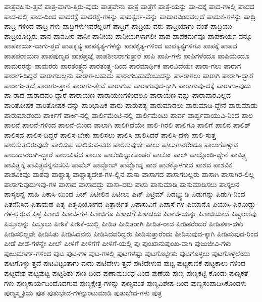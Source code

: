 {ಪಾತ್ರವಹಿಸು-ತ್ತವೆ
ಪಾತ್ರ-ವಾಗು-ತ್ತಿರು-ವುದು
ಪಾತ್ರವೇನು
ಪಾತ್ರೆ
ಪಾತ್ರೆಗೆ
ಪಾತ್ರೆ-ಯನ್ನು
ಪಾ-ದಕ್ಕೆ
ಪಾದ-ಗಳಲ್ಲಿ
ಪಾದದ
ಪಾದ-ದಲ್ಲಿ
ಪಾದ-ದಿಂದ
ಪಾದರಕ್ಷೆ
ಪಾದರಕ್ಷೆ-ಗಳನ್ನು
ಪಾದಸ್ಪರ್ಶ-ವನ್ನು
ಪಾದಾರವಿಂದವಲ್ಲದೆ
ಪಾದುಕೆ-ಗಳನ್ನು
ಪಾದ್ರಿ
ಪಾದ್ರಿ-ಗಳಿಂದ
ಪಾದ್ರಿ-ಗಳು
ಪಾದ್ರಿಗಳುಇವರೆಲ್ಲರಿಗೆ
ಪಾದ್ರಿಗೆ
ಪಾದ್ರಿಯ-ವರು
ಪಾದ್ರಿಯಾಗು-ವಂತೆ
ಪಾದ್ರಿಯು
ಪಾದ್ರಿಯೊಬ್ಬರು
ಪಾನ
ಪಾನಪೀಠ
ಪಾನೀ
ಪಾನೀಯ
ಪಾನೀಯಗಳಾಗಲೀ
ಪಾಪ
ಪಾಪಕರ್ಮವೂ
ಪಾಪಕಾರ್ಯ-ವನ್ನೂ
ಪಾಪಕಾರ್ಯ-ವಾಗು-ತ್ತದೆ
ಪಾಪಕೃತ್ಯ
ಪಾಪಕೃತ್ಯ-ಗಳನ್ನು
ಪಾಪಕೃತ್ಯ-ಗಳಿಂದ
ಪಾಪಕೃತ್ಯಗಳಿಗೂ
ಪಾಪಕ್ಕೆ
ಪಾಪದ
ಪಾಪಪರಾಯಣ
ಪಾಪಪುಣ್ಯದ
ಪಾಪಪ್ರಜ್ಞೆ
ಪಾಪಶೀಲರಾಗುತ್ತಾರೆ
ಪಾಪಿ
ಪಾಪಿ-ಗಳು
ಪಾಪಿಗಳೆಂದೂ
ಪಾಪಿಯೆಂದೂ
ಪಾಮರರನ್ನು
ಪಾಮರರು
ಪಾರತಂತ್ರ್ಯದ
ಪಾರತಂತ್ರ್ಯ-ದಿಂದ
ಪಾರಮಾರ್ಥಿಕ
ಪಾರವಿದೆಯೇ
ಪಾರಾ-ಗಲು
ಪಾರಾಗ
ಪಾರಾಗ-ದಿದ್ದರೆ
ಪಾರಾಗಬಲ್ಲನು
ಪಾರಾಗ-ಬಹುದು
ಪಾರಾಗಬಹುದೆಂಬುದನ್ನು
ಪಾ-ರಾಗಲು
ಪಾರಾಗಿ
ಪಾರಾಗಿ-ದ್ದಾರೆ
ಪಾರಾಗು-ತ್ತದೆ
ಪಾರಾಗು-ತ್ತಾನೆ
ಪಾರಾಗು-ತ್ತೇವೆ
ಪಾರಾಗುವ
ಪಾರಾಗುವುದ-ಕ್ಕಾಗಿ
ಪಾರಾಗುವು-ದಕ್ಕೆ
ಪಾರಾಗು-ವುದು
ಪಾ-ರಾದ
ಪಾರಾದವರಿ-ದ್ದಾರೆ
ಪಾರಾಯಣ
ಪಾರಾಯಣಗಳಿಂದಲೂ
ಪಾರಾಯಣ-ವನ್ನು
ಪಾರಾವಾರವಿಲ್ಲದ
ಪಾರಿತೋಷಕ
ಪಾರಿತೋಷಕ-ವನ್ನು
ಪಾರಿಭಾಷಿಕ
ಪಾರು
ಪಾರುಪತ್ಯ
ಪಾರುಮಾಡಲು
ಪಾರುಮಾಡಿ-ದ್ದೇನೆ
ಪಾರುಮಾಡು
ಪಾರುಮಾಡೆಂದು
ಪಾರ್ಕಿಗೆ
ಪಾರ್ಕಿ-ನಲ್ಲಿ
ಪಾರ್ಲಿಮೆಂಟಿ-ನಲ್ಲಿ
ಪಾರ್ಲಿಮೆಂಟು
ಪಾರ್ವ
ಪಾರ್ಶ್ವವಾಯುವಿ-ನಿಂದ
ಪಾಲ
ಪಾಲನೆ
ಪಾಲನೆ-ಗಳಿಂದ
ಪಾಲನೆ-ಯಿಂದ
ಪಾಲಾಗಿ
ಪಾಲಿಗಿದೆಯೇ
ಪಾಲಿ-ಗಿರಲಿ
ಪಾಲಿಗೂ
ಪಾಲಿಗೆ
ಪಾಲಿನ
ಪಾಲಿಶ್
ಪಾಲಿಸದ
ಪಾಲಿಸ-ದಿದ್ದರೆ
ಪಾಲಿಸ-ಬೇಕು
ಪಾಲಿಸಲು
ಪಾಲಿಸಿ
ಪಾಲಿಸಿದರೆ
ಪಾಲಿಸಿ-ದಳು
ಪಾಲಿ-ಸುತ್ತ
ಪಾಲಿಸುತ್ತಲಿರುವುದೇ
ಪಾಲಿಸುವ
ಪಾಲಿಸುವ-ವರು
ಪಾಲಿಸುವುದೇ
ಪಾಲು
ಪಾಲುಗಾರರೆಂದೂ
ಪಾಲುಗೊಳ್ಳುವ
ಪಾಲುದಾರರಾಗಿ-ದ್ದಾರೆ
ಪಾಲುವಿಷದ
ಪಾಲೂ
ಪಾಲೆಂದಿಟ್ಟುಕೊಂಡರೆ
ಪಾಲೋ
ಪಾಲ್
ಪಾಲ್ಗೊಂಡಿ-ದ್ದೇನೆ
ಪಾವಿತ್ರ್ಯ
ಪಾವಿತ್ರ್ಯಕ್ಕೆ
ಪಾವಿತ್ರ್ಯವನ್ನನುಸರಿಸಿ
ಪಾವೆಲ್
ಪಾವ್ಲೋವ್
ಪಾವ್ಲೋವ್ನ
ಪಾಶ
ಪಾಶಕ್ಕೊಳಗಾದ
ಪಾಶದ
ಪಾಶವಿಕ
ಪಾಶವಿಕವೂ
ಪಾಶವು
ಪಾಶ್ಚಾತ್ಯ
ಪಾಶ್ಚಾತ್ಯದೇಶ-ಗಳ-ಲ್ಲಿನ
ಪಾಸಾ
ಪಾಸಾಗದ
ಪಾಸಾಗಬಲ್ಲರು
ಪಾಸಾಗಿ
ಪಾಸಾಗಿರ-ಲಿಲ್ಲ
ಪಾಸಾಗುವುದುಇವು-ಗಳ
ಪಾಸಾದ
ಪಾಸಾದದ್ದು
ಪಾಸಾ-ದರು
ಪಾಸು
ಪಾಸುಮಾಡಿ
ಪಾಸುಮಾಡಿಸಲು
ಪಾಸ್ಕಲನ
ಪಾಸ್ಕಲನ್ಣ
ಪಾಹಿ
ಪಿಕಾಸಿ-ಯಿಂದ
ಪಿಚ್
ಪಿಟೀಲಿನ
ಪಿಟೀಲು
ಪಿಟ್
ಪಿಟ್ರಿಮ್
ಪಿಡಬ್ಲ್ಯುಡಿ
ಪಿಡುಗನ್ನು
ಪಿಡುಗಿ-ನಿಂದ
ಪಿತನೆನಿಸಿದ
ಪಿತಾಮಹ
ಪಿತೃ
ಪಿತೃವಿಯೋಗದ
ಪಿತ್ರಾರ್ಜಿತ
ಪಿಪಾಸುವಿಗೆ
ಪಿಪಾಸೆ-ಗಳ
ಪಿಯಾನೊ
ಪಿಯುಸಿ
ಪಿರಮಿಡ್ಡು-ಗಳ-ಲ್ಲಿರುವ
ಪಿಳ್ಳೆ
ಪಿಶಾಚಿ
ಪಿಶಾಚಿ-ಗಳ
ಪಿಶಾಚಿಗೂ
ಪಿಶಾಚಿಗೆ
ಪಿಶಾಚಿಯ
ಪಿಶಾಚಿ-ಯನ್ನು
ಪಿಶಾಚಿಯಾದೆ
ಪಿಷ್ಟಾಂಶವು
ಪಿಸ್ತೂಲನ್ನು
ಪಿಸ್ತೂಲು
ಪೀಠಿಕೆ
ಪೀಠಿಕೆ-ಯಲ್ಲಿ
ಪೀಡಿತ
ಪೀಡಿತರಾಗಿ
ಪೀಡಿತ-ರಾದ
ಪೀಡಿತರೆಂದರೆ
ಪೀಡಿತಳಾ-ದಳು
ಪೀಡಿಸಲಿಲ್ಲವೇ
ಪೀಡಿಸಿತು
ಪೀಡಿಸಿದವನು
ಪೀಡಿಸಿದವರಿದ್ದರು
ಪೀಡಿಸುತ್ತಾರೆಂದು
ಪೀಡಿಸುವುದ-ಕ್ಕಾಗಿ
ಪೀಡಿಸುವುದ-ರಿಂದ
ಪೀಡೆ
ಪೀಡೆ-ಗಳನ್ನೇ
ಪೀಲ್
ಪೀಳಿಗೆ
ಪೀಳಿಗೆಗೆ
ಪೀಳಿಗೆ-ಯಲ್ಲಿ
ಪು
ಪುಂಖಾನುಪುಂಖ-ವಾಗಿ
ಪುಜುಜೀವಿ-ಗಳು
ಪುಜುಮಾರ್ಗ-ಗಳಿಂದ
ಪುಟ
ಪುಟ-ಗಳ
ಪುಟ-ಗಳಲ್ಲಿ
ಪುಟಗಳಷ್ಟು
ಪುಟಗೊಟ್ಟೀತು
ಪುಟಗೊಳ್ಳಲು
ಪುಟಗೊಳ್ಳಲೆಂದು
ಪುಟಗೊಳ್ಳು-ತ್ತದೆ
ಪುಟವಿಟ್ಟಂತಾಗು-ವುದು
ಪುಟಿದೇಳು-ತ್ತದೆ
ಪುಟಿದೇಳುವ
ಪುಟ್ಟ
ಪುಟ್ಟಕಾಣಿಕೆ
ಪುಟ್ಟಕಾಲು-ಗಳಿಂದ
ಪುಟ್ಟದೇಶ
ಪುಟ್ಟಪುಟ್ಟ
ಪುಟ್ಟಶಿಶು
ಪುಣ-ದಿಂದ
ಪುಣಾನುಬಂಧ-ದಿಂದ
ಪುಣೆಯ
ಪುಣ್ಯ
ಪುಣ್ಯಕಟ್ಟಿ-ಕೊಂಡು
ಪುಣ್ಯಕತೆ-ಗಳು
ಪುಣ್ಯಕಾರ್ಯದಿಂದೊದಗುವ
ಪುಣ್ಯಕ್ಷೇತ್ರ-ಗಳನ್ನು
ಪುಣ್ಯವಂತ
ಪುಣ್ಯವಿಶೇಷ-ದಿಂದ
ಪುಣ್ಯಸಂಪಾದಿಸಿಕೊಂಡಳು
ಪುಣ್ಯಸ್ಮೃತಿಯ
ಪುತ
ಪುತುಭೇದ-ಗಳನ್ನುಂಟುಮಾಡಿ
ಪುತುಭೇದ-ಗಳು
ಪುತ್ರ
}
